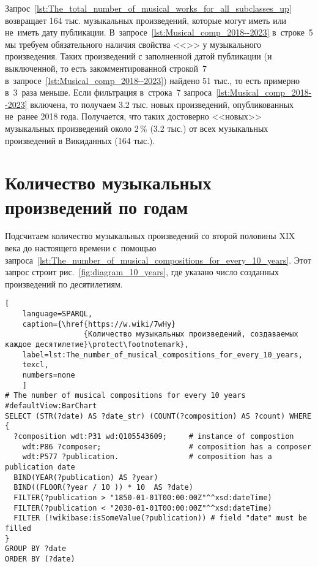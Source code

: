 Запрос~\ref{lst:The_total_number_of_musical_works_for_all_subclasses_up} 
возвращает 164 тыс. музыкальных произведений, которые могут иметь или не~иметь дату публикации. 
В~запросе~\ref{lst:Musical_comp_2018--2023} в~строке~5 
мы требуем обязательного наличия свойства <<>> у музыкального произведения.
Таких произведений с заполненной датой публикации 
(и выключенной, 
 то есть закомментированной строкой~7 в~запросе~\ref{lst:Musical_comp_2018--2023}) найдено 51 тыс., 
то есть примерно в~3~раза меньше. 
Если фильтрация в~строка~7 запроса~\ref{lst:Musical_comp_2018--2023} включена, 
то получаем 3.2 тыс. новых произведений, опубликованных не~ранее 2018 года. 
Получается, что таких достоверно <<новых>> музыкальных произведений 
около 2\,\% (3.2 тыс.) от всех музыкальных произведений в Викиданных (164 тыс.).






\section{Количество музыкальных произведений по годам}

Подсчитаем количество музыкальных произведений 
со второй половины XIX века до настоящего времени 
с~помощью запроса~\ref{lst:The_number_of_musical_compositions_for_every_10_years}. 
Этот запрос строит рис.~\ref{fig:diagram_10_years}, где 
указано число созданных произведений по десятилетиям. 


\begin{lstlisting}[ 
    language=SPARQL,
    caption={\href{https://w.wiki/7wHy}
                  {Количество музыкальных произведений, создаваемых каждое десятилетие}\protect\footnotemark},
    label=lst:The_number_of_musical_compositions_for_every_10_years,
    texcl,
    numbers=none
    ]
# The number of musical compositions for every 10 years
#defaultView:BarChart
SELECT (STR(?date) AS ?date_str) (COUNT(?composition) AS ?count) WHERE {
  ?composition wdt:P31 wd:Q105543609;     # instance of compostion
    wdt:P86 ?composer;                    # composition has a composer
    wdt:P577 ?publication.                # composition has a publication date
  BIND(YEAR(?publication) AS ?year)
  BIND((FLOOR(?year / 10 )) * 10  AS ?date)
  FILTER(?publication > "1850-01-01T00:00:00Z"^^xsd:dateTime)
  FILTER(?publication < "2030-01-01T00:00:00Z"^^xsd:dateTime) 
  FILTER (!wikibase:isSomeValue(?publication)) # field "date" must be filled
}
GROUP BY ?date
ORDER BY (?date)
\end{lstlisting}%


